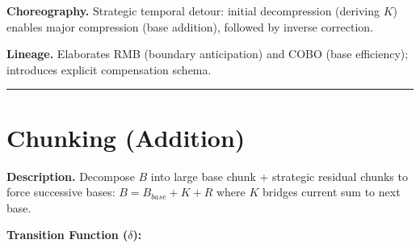 \documentclass[12pt]{book}
\begin{document}
\textbf{Choreography.} Strategic temporal detour: initial decompression
(deriving \(K\)) enables major compression (base addition), followed by
inverse correction.

\textbf{Lineage.} Elaborates RMB (boundary anticipation) and COBO (base
efficiency); introduces explicit compensation schema.

\begin{center}\rule{0.5\linewidth}{0.5pt}\end{center}

\section{Chunking (Addition)}\label{chunking-addition}

\textbf{Description.} Decompose \(B\) into large base chunk + strategic
residual chunks to force successive bases: \(B = B_{base} + K + R\)
where \(K\) bridges current sum to next base.

\textbf{Transition Function (\(\delta\)):}
\end{document}
